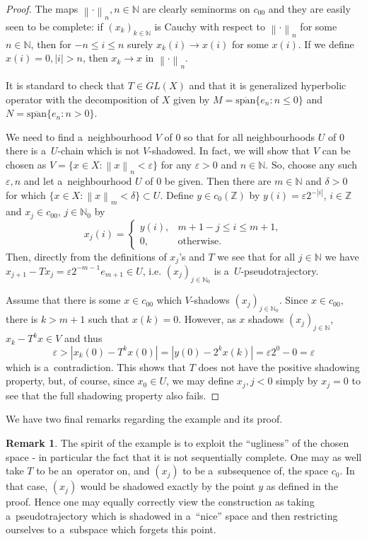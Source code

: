 \documentclass[11pt,a4paper]{amsart}
\theoremstyle{definition}
\newtheorem{remark}[theorem]{Remark}
\newcommand{\Z}{\mathbb{Z}}
\newcommand{\N}{\mathbb{N}}
\newcommand{\eps}{\varepsilon}
\newcommand{\abs}[1]{\left| #1 \right|}
\newcommand{\norm}[1]{\left\| #1 \right\|}
\newcommand{\linsp}{\mathrm{span}}
\newcommand{\cllinsp}{\overline{\linsp}}
\begin{document}
	\begin{proof}
		The maps $\norm{\cdot}_n, n \in \N$ are clearly seminorms on $c_{00}$ and they are easily seen to be complete: if $(x_k)_{k \in \N}$ is Cauchy with respect to $\norm{\cdot}_n$ for some $n \in \N$, then for $-n \leq i \leq n$ surely $x_k(i) \to x(i)$ for some $x(i)$. If we define $x(i) = 0, \abs{i} > n$, then $x_k \to x$ in \(\norm{\cdot}_n\).
		
		It is standard to check that $T \in GL(X)$ and that it is generalized hyperbolic operator with the decomposition of $X$ given by $M = \cllinsp\{e_n : n \leq 0\}$ and $N = \cllinsp\{e_n : n > 0\}$.
		
		We need to find a~neighbourhood $V$ of $0$ so that for all neighbourhoods $U$ of $0$ there is a~$U$-chain which is not $V$-shadowed. In fact, we will show that $V$ can be chosen as $V = \{x \in X : \norm{x}_n < \eps\}$ for any $\eps > 0$ and $n \in \N$. So, choose any such $\eps, n$ and let a~neighbourhood $U$ of $0$ be given. Then there are $m \in \N$ and $\delta > 0$ for which $\{x \in X : \norm{x}_m < \delta\} \subset U$. Define $y \in c_0(\Z)$ by $y(i) = \eps 2^{-\abs{i}}$, $i \in \Z$ and $x_j \in c_{00}$, $j \in \N_0$ by
		\begin{equation*}
			x_j(i) = \begin{cases}
				y(i), &m+1-j \leq i \leq m+1,\\
				0, &\text{otherwise}.
			\end{cases}
		\end{equation*}
		Then, directly from the definitions of $x_j$'s and $T$ we see that for all $j \in \N$ we have $x_{j+1} - Tx_j = \eps2^{-m-1} e_{m+1} \in U$, i.e. $(x_j)_{j \in \N_0}$ is a~$U$-pseudotrajectory.
		
		Assume that there is some $x \in c_{00}$ which $V$-shadows $(x_j)_{j\in\N_0}$. Since $x \in c_{00}$, there is $k > m+1$ such that $x(k) = 0$. However, as $x$ shadows $(x_j)_{j\in\N}$, $x_k - T^kx \in V$ and thus
		\begin{equation*}
			\eps > \abs{x_k(0) - T^kx(0)} = \abs{y(0) - 2^k x(k)} = \eps2^0 - 0 = \eps
		\end{equation*}
		which is a~contradiction. This shows that $T$ does not have the positive shadowing property, but, of course, since $x_0 \in U$, we may define $x_j, j < 0$ simply by $x_j = 0$ to see that the full shadowing property also fails.
	\end{proof}
	
	We have two final remarks regarding the example and its proof.
	\begin{remark}
		The spirit of the example is to exploit the ``ugliness'' of the chosen space - in particular the fact that it is not sequentially complete. One may as well take $T$ to be an~operator on, and $(x_j)$ to be a~subsequence of, the space $c_0$. In that case, $(x_j)$ would be shadowed exactly by the point $y$ as defined in the proof. Hence one may equally correctly view the construction as taking a~pseudotrajectory which is shadowed in a~``nice'' space and then restricting ourselves to a~subspace which forgets this point.
	\end{remark}
	
\end{document}
